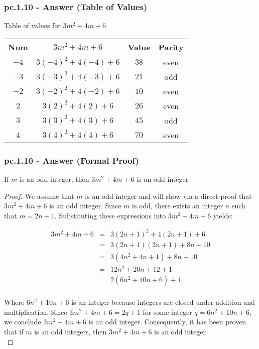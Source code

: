 \subsubsection*{pc.1.10 - Answer (Table of Values)}
Table of values for $3m^2 + 4m + 6$ \\
\begin{center}
\begin{tabular}{|c|c|c|c|}
\hline 
Num & $3m^2 + 4m + 6$ & Value & Parity \\ 
\hline 
$-4$ & $3(-4)^2 + 4(-4) + 6$ & $38$ & even \\ 
\hline 
$-3$ & $3(-3)^2 + 4(-3) + 6$ & $21$ & odd \\ 
\hline 
$-2$ & $3(-2)^2 + 4(-2) + 6$ & $10$ & even \\ 
\hline 
$2$ & $3(2)^2 + 4(2) + 6$ & $26$ & even \\ 
\hline 
$3$ & $3(3)^2 + 4(3) + 6$ & $45$ & odd \\ 
\hline 
$4$ & $3(4)^2 + 4(4) + 6$ & $70$ & even \\ 
\hline 
\end{tabular} 
\end{center}

\subsubsection*{pc.1.10 - Answer (Formal Proof)}

\begin{tcolorbox}
\begin{theorem}
If $m$ is an odd integer, then $3m^2 + 4m + 6$ is an odd integer
\end{theorem}
\end{tcolorbox}

\begin{proof}

We assume that $m$ is an odd integer and will show via a direct proof that $3m^2 + 4m + 6$ is an odd integer. Since $m$ is odd, there exists an integer $n$ such that $m = 2n + 1$. Substituting these expressions into $3m^2 + 4m + 6$ yields:

\begin{eqnarray*}
3m^2 + 4m + 6 & = & 3(2n + 1)^2 + 4(2n + 1) + 6 \nonumber \\
& = & 3(2n + 1)(2n + 1) + 8n + 10 \nonumber \\
& = & 3(4n^2 + 4n + 1) + 8n + 10 \nonumber \\
& = & 12n^2 + 20n + 12 + 1 \nonumber \\
& = & 2(6n^2 + 10n + 6) + 1 \nonumber \\
\end{eqnarray*}

Where $6n^2 + 10n + 6$ is an integer because integers are closed under addition and multiplication. Since $3m^2 + 4m + 6 = 2q + 1$ for some integer $q = 6n^2 + 10n + 6$, we conclude $3m^2 + 4m + 6$ is an odd integer. Consequently, it has been proven that if $m$ is an odd integers, then $3m^2 + 4m + 6$ is an odd integer \\

\end{proof}


